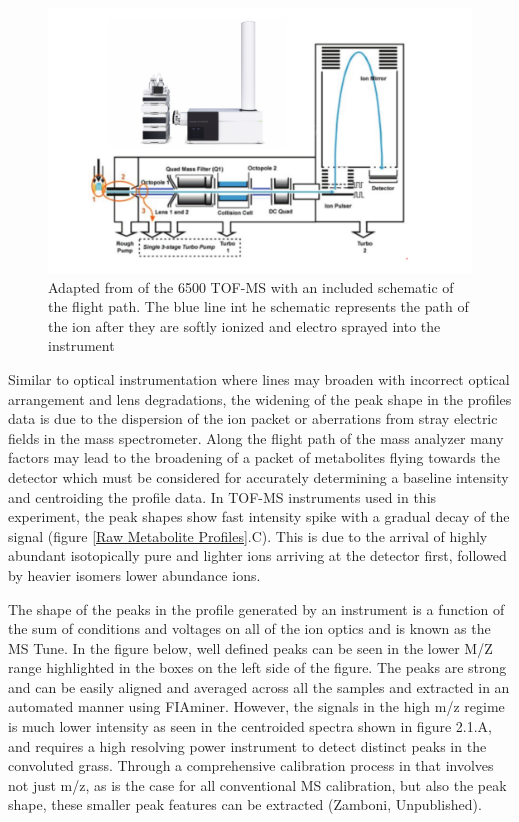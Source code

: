 \documentclass[a4paper,11pt,twoside]{book}
\begin{document}
	\begin{figure}[hbt!]
		\centering
		\includegraphics[width=\linewidth]{3.Metabolomics/MS.pdf}
		\caption{Adapted from \citep{AgilentTechnologies2017} of the 6500 TOF-MS with an included schematic of the flight path. The blue line int he schematic represents the path of the ion after they are softly ionized and electro sprayed into the instrument }
		\label{fig:A schematic of the 6550 Time-of-flight Mass spectrometer}
	\end{figure}
	
	Similar to optical instrumentation where lines may broaden with incorrect optical arrangement and lens degradations, the widening of the peak shape in the profiles data is due to the dispersion of the ion packet or aberrations from stray electric fields in the mass spectrometer\citep{Glish2003TheCentury}. Along the flight path of the mass analyzer many factors may lead to the broadening of a packet of metabolites flying towards the detector which must be considered for accurately determining a baseline intensity and centroiding the profile data. In TOF-MS instruments used in this experiment, the peak shapes show fast intensity spike with a gradual decay of the signal (figure \ref{Raw Metabolite Profiles}.C). This is due to the arrival of highly abundant isotopically pure and lighter ions arriving at the detector first, followed by heavier isomers lower abundance ions.
	
	The shape of the peaks in the profile generated by an instrument is a function of the sum of conditions and voltages on all of the ion optics and is known as the MS Tune. In the figure below, well defined peaks can be seen in the lower M/Z range highlighted in the boxes on the left side of the figure. The peaks are strong and can be easily aligned and averaged across all the samples and extracted in an automated manner using FIAminer. However, the signals in the high m/z regime is much lower intensity as seen in the centroided spectra shown in figure 2.1.A, and requires a high resolving power instrument to detect distinct peaks in the convoluted grass. Through a comprehensive calibration process in that involves not just m/z, as is the case for all conventional MS calibration, but also the peak shape, these smaller peak features can be extracted (Zamboni, Unpublished). 
	
\end{document}
